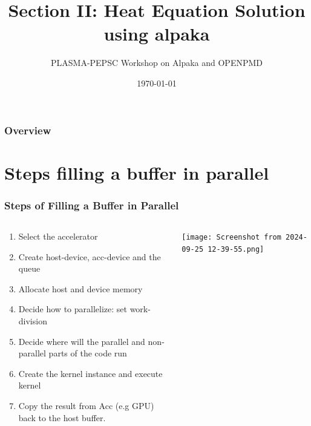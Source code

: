 \documentclass[9pt]{beamer}
\title{Section II: Heat Equation Solution using alpaka} %
\author{PLASMA-PEPSC Workshop on Alpaka and OPENPMD} %
\institute[HZDR] %
{
\\ %
\medskip
\textit{} %
}
\date{\today} %
\begin{document}
\begin{frame}
\titlepage %
\end{frame}


\begin{frame}
\frametitle{Overview} %
\tableofcontents %
\end{frame}

\section{Steps filling a buffer in parallel}
\begin{frame}
\frametitle{Steps of Filling a Buffer in Parallel}
\begin{columns}

    \begin{column}{0.55\textwidth} %
    \begin{enumerate}
     \item Select the accelerator
     \item Create host-device, acc-device and the queue
     \item Allocate host and device memory
     \item Decide how to parallelize: set work-division
     \item Decide where will the parallel and non-parallel parts of the code run
     \item Create the kernel instance and execute kernel
     \item Copy the result from Acc (e.g GPU) back to the host buffer.
    \end{enumerate}
    \end{column}

    \begin{column}{0.45\textwidth} %
        \centering
        \texttt{[image: Screenshot from 2024-09-25 12-39-55.png]} %
    \end{column}

\end{columns}


    \end{frame}
\end{document}
